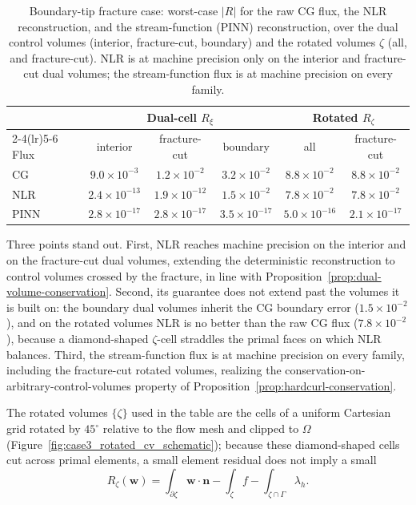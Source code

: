 \documentclass[a4paper,fleqn]{cas-sc}
\begin{document}
\begin{table}[!htbp]
\centering
\caption{Boundary-tip fracture case: worst-case \(|R|\) for the raw CG flux, the NLR
reconstruction, and the stream-function (PINN) reconstruction, over the dual
control volumes (interior, fracture-cut, boundary) and the rotated volumes
\(\zeta\) (all, and fracture-cut). NLR is at machine precision only on the
interior and fracture-cut dual volumes; the stream-function flux is at machine
precision on every family.}
\label{tab:case3_conservation}
\begin{tabular}{lccccc}
\toprule
 & \multicolumn{3}{c}{Dual-cell \(R_\xi\)} & \multicolumn{2}{c}{Rotated \(R_\zeta\)} \\
\cmidrule(lr){2-4}\cmidrule(lr){5-6}
Flux & interior & fracture-cut & boundary & all & fracture-cut \\
\midrule
CG   & \(9.0\times10^{-3}\)  & \(1.2\times10^{-2}\)  & \(3.2\times10^{-2}\) & \(8.8\times10^{-2}\) & \(8.8\times10^{-2}\) \\
NLR  & \(2.4\times10^{-13}\) & \(1.9\times10^{-12}\) & \(1.5\times10^{-2}\) & \(7.8\times10^{-2}\) & \(7.8\times10^{-2}\) \\
PINN & \(2.8\times10^{-17}\) & \(2.8\times10^{-17}\) & \(3.5\times10^{-17}\) & \(5.0\times10^{-16}\) & \(2.1\times10^{-17}\) \\
\bottomrule
\end{tabular}
\end{table}

Three points stand out. First, NLR reaches machine precision on the interior and
on the fracture-cut dual volumes, extending the deterministic reconstruction to
control volumes crossed by the fracture, in line with
Proposition~\ref{prop:dual-volume-conservation}. Second, its guarantee does not
extend past the volumes it is built on: the boundary dual volumes inherit the CG
boundary error (\(1.5\times10^{-2}\)), and on the rotated volumes NLR is no
better than the raw CG flux (\(7.8\times10^{-2}\)), because a diamond-shaped
\(\zeta\)-cell straddles the primal faces on which NLR balances. Third, the
stream-function flux is at machine precision on every family, including the
fracture-cut rotated volumes, realizing the conservation-on-arbitrary-control-volumes
property of Proposition~\ref{prop:hardcurl-conservation}.

The rotated volumes \(\{\zeta\}\) used in the table are the cells of a uniform
Cartesian grid rotated by \(45^\circ\) relative to the flow mesh and clipped to
\(\Omega\) (Figure~\ref{fig:case3_rotated_cv_schematic}); because these
diamond-shaped cells cut across primal elements, a small element residual does
not imply a small
\[
  R_\zeta(\mathbf{w})
  =
  \int_{\partial\zeta}\mathbf{w}\cdot\mathbf{n}
  - \int_\zeta f
  - \int_{\zeta\cap\Gamma}\lambda_h .
\]
\end{document}
